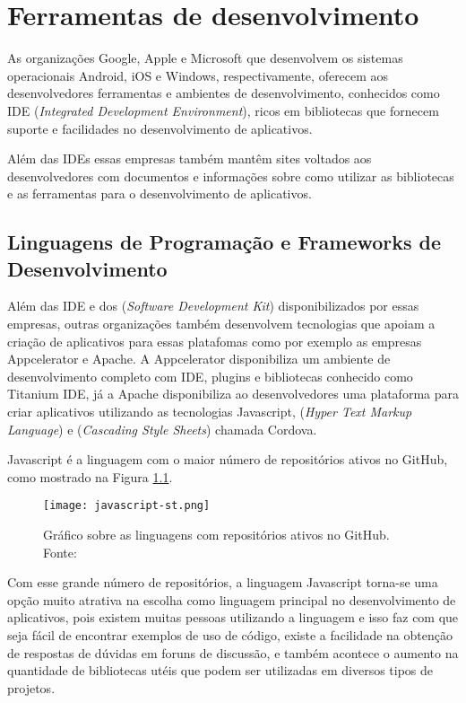 \chapter{Ferramentas de desenvolvimento}\label{cha:ferramentas}
As organizações Google, Apple e Microsoft que desenvolvem os sistemas operacionais Android, iOS e Windows, respectivamente, oferecem aos desenvolvedores ferramentas e ambientes de desenvolvimento, conhecidos como IDE (\textit{Integrated Development Environment}), ricos em bibliotecas que fornecem suporte e facilidades no desenvolvimento de aplicativos.

Além das IDEs essas empresas também mantêm sites voltados aos desenvolvedores com documentos e informações sobre como utilizar as bibliotecas e as ferramentas para o desenvolvimento de aplicativos.

\section{Linguagens de Programação e Frameworks de Desenvolvimento}
Além das IDE e dos  (\textit{Software Development Kit}) disponibilizados por essas empresas, outras organizações também desenvolvem tecnologias que apoiam a criação de aplicativos para essas platafomas como por exemplo as empresas Appcelerator e Apache. A Appcelerator disponibiliza um ambiente de desenvolvimento completo com IDE, plugins e bibliotecas conhecido como Titanium IDE, já a Apache disponibiliza ao desenvolvedores uma plataforma para criar aplicativos utilizando as tecnologias Javascript,  (\textit{Hyper Text Markup Language}) e  (\textit{Cascading Style Sheets}) chamada Cordova.

Javascript é a linguagem com o maior número de repositórios ativos no GitHub, como mostrado na Figura \ref{fig:javascript}.

\begin{figure}[!htb]
	\centering
	\texttt{[image: javascript-st.png]} %
	\caption[Linguagens com maior número de repositórios ativos no GitHub]{Gráfico sobre as linguagens com repositórios ativos no GitHub. Fonte: \cite{githut}}
	\label{fig:javascript}
\end{figure}
\vspace{-3mm}

Com esse grande número de repositórios, a linguagem Javascript torna-se uma opção muito atrativa na escolha como linguagem principal no desenvolvimento de aplicativos, pois existem muitas pessoas utilizando a linguagem e isso faz com que seja fácil de encontrar exemplos de uso de código, existe a facilidade na obtenção de respostas de dúvidas em foruns de discussão, e também acontece o aumento na quantidade de bibliotecas utéis que podem ser utilizadas em diversos tipos de projetos.

